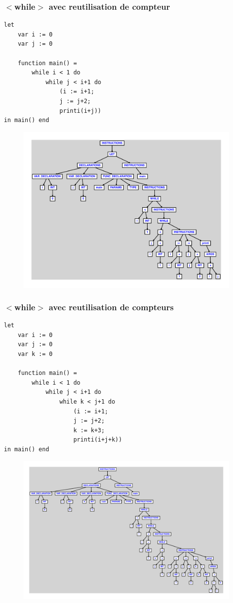 \documentclass{article}
\begin{document}
\subsubsection{$ < $while$ > $ avec reutilisation de compteur}
\begin{lstlisting}
let
	var i := 0
	var j := 0

	function main() =
		while i < 1 do
			while j < i+1 do
				(i := i+1;
				j := j+2;
				printi(i+j))
in main() end
\end{lstlisting}
\newpage
\begin{figure}[H]
\centering
\includegraphics[max width=\textwidth]{ast/ast_338.pdf}
\end{figure}
\newpage
\subsubsection{$ < $while$ > $ avec reutilisation de compteurs}
\begin{lstlisting}
let
	var i := 0
	var j := 0
	var k := 0

	function main() =
		while i < 1 do
			while j < i+1 do
				while k < j+1 do
					(i := i+1;
					j := j+2;
					k := k+3;
					printi(i+j+k))
in main() end
\end{lstlisting}
\newpage
\begin{figure}[H]
\centering
\includegraphics[max width=\textwidth]{ast/ast_339.pdf}
\end{figure}
\newpage
\end{document}
